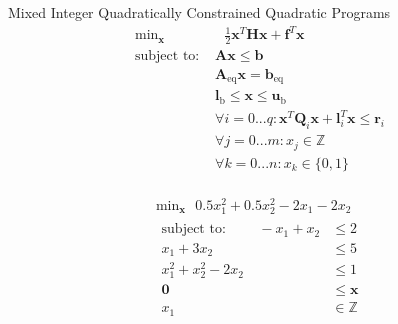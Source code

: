 \documentclass{article}
\begin{document}
Mixed Integer Quadratically Constrained Quadratic Programs
\begin{align*}
    \text{min}_{\mathbf{x}}& \text{ } \frac{1}{2}\mathbf{x}^T \mathbf{H} \mathbf{x} + \mathbf{f}^T \mathbf{x} \\
    \mbox{subject to: }& \mathbf{A}\mathbf{x} \le \mathbf{b}\\
                       & \mathbf{A}_{\text{eq}}\mathbf{x} = \mathbf{b}_{\text{eq}}\\
                       & \mathbf{l}_{\text{b}} \le \mathbf{x} \le \mathbf{u}_{\text{b}}\\
                       & \forall i = 0...q : \mathbf{x}^T \mathbf{Q}_i \mathbf{x} + \mathbf{l}_i^T \mathbf{x} \le \mathbf{r}_i\\
                       & \forall j = 0...m : x_j \in \mathbb{Z}\\
                       & \forall k = 0...n : x_k \in \{0,1\}\\
\end{align*}

\begin{align*}
    \text{min}_{\mathbf{x}} \text{ } 0.5x_1^2 + 0.5x_2^2 - 2x_1 - 2x_2\\
    \begin{aligned}
    \mbox{subject to: } \qquad -x_1 + x_2 &\le 2\\
                        x_1 + 3x_2 &\le 5\\
                        x_1^2 + x_2^2 - 2x_2 &\le 1\\
                        \mathbf{0} &\le \mathbf{x}\\
                        x_1 &\in \mathbb{Z}\\
    \end{aligned}
\end{align*}
\end{document}
